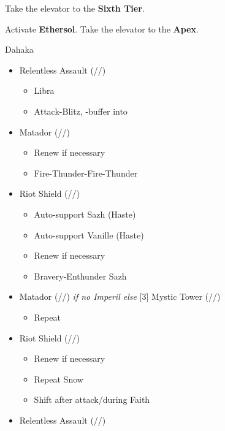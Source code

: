	\renewcommand{\first}{[1] Riot Shield (\syn/\sen/\rav)}
	\renewcommand{\second}{[2] Relentless Assault (\com/\rav/\rav)}
	\renewcommand{\third}{[3] Mystic Tower (\rav/\sen/\rav)}
	\renewcommand{\fourth}{[4] Aggression (\com/\com/\rav)}
	\renewcommand{\fifth}{[5] Matador (\rav/\sen/\sab)}
	\renewcommand{\sixth}{[6] Aggression (\com/\com/\rav)}

	Take the elevator to the \textbf{Sixth Tier}.

	Activate \textbf{Ethersol}.
	Take the elevator to the \textbf{Apex}.

	\begin{battle}[1:30]{Dahaka}
		\begin{itemize}
			\item \second
			      \begin{itemize}
				      \item Libra
				      \item Attack-Blitz, \rav-buffer into
			      \end{itemize}
			\item \fifth
			      \begin{itemize}
				      \item Renew if necessary
				      \item Fire-Thunder-Fire-Thunder
			      \end{itemize}
			\item \first
			      \begin{itemize}
				      \item Auto-support Sazh (Haste)
				      \item Auto-support Vanille (Haste)
				      \item Renew if necessary
				      \item Bravery-Enthunder Sazh
			      \end{itemize}
			\item \fifth \textit{ if no Imperil else } \third
			      \begin{itemize}
				      \item Repeat
			      \end{itemize}
			\item \first
			      \begin{itemize}
				      \item Renew if necessary
				      \item Repeat Snow
				      \item Shift after attack/during Faith
			      \end{itemize}
			\item \second

\end{itemize}
\end{battle}
